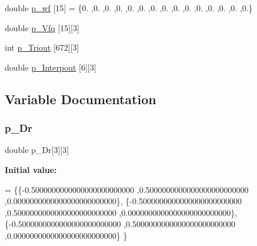 \begin{DoxyCompactItemize}
\item 
double \hyperlink{a00446_a4a714d64e156eb17585528681e36dba6}{p\+\_\+wf} \mbox{[}15\mbox{]} = \{0. ,0. ,0. ,0. ,0. ,0. ,0. ,0. ,0. ,0. ,0. ,0. ,0. ,0. ,0.\}
\item 
double \hyperlink{a00446_a1e30e50d0c2f8546d1417b9c45578b7e}{p\+\_\+\+Vfq} \mbox{[}15\mbox{]}\mbox{[}3\mbox{]}
\item 
int \hyperlink{a00446_a7f90b20ad7d8264bd9dd59b33b9dcbd7}{p\+\_\+\+Triout} \mbox{[}672\mbox{]}\mbox{[}3\mbox{]}
\item 
double \hyperlink{a00446_af62f12b714a2ff2e1818599ff3209595}{p\+\_\+\+Interpout} \mbox{[}6\mbox{]}\mbox{[}3\mbox{]}
\end{DoxyCompactItemize}


\subsection{Variable Documentation}
\mbox{\label{a00446_a718230132f9add142e28fd9078b7a818}} 
\subsubsection{\texorpdfstring{p\+\_\+\+Dr}{p\_Dr}}
{\footnotesize\ttfamily double p\+\_\+\+Dr\mbox{[}3\mbox{]}\mbox{[}3\mbox{]}}

{\bfseries Initial value\+:}
\begin{DoxyCode}
= \{\{-0.5000000000000000000000000 ,0.5000000000000000000000000 ,0.0000000000000000000000000\},
\{-0.5000000000000000000000000 ,0.5000000000000000000000000 ,0.0000000000000000000000000\},
\{-0.5000000000000000000000000 ,0.5000000000000000000000000 ,0.0000000000000000000000000\}
\}
\end{DoxyCode}
\mbox{\label{a00446_a9b5708d4dc0fb4dd8247af258efc129a}} 
